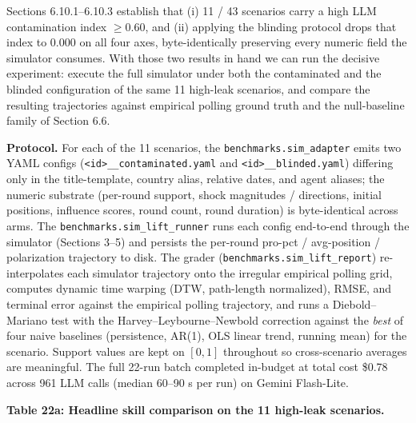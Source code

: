 \documentclass[
]{article}
\begin{document}
Sections 6.10.1--6.10.3 establish that (i) 11 / 43 scenarios carry a
high LLM contamination index \(\geq 0.60\), and (ii) applying the
blinding protocol drops that index to 0.000 on all four axes,
byte-identically preserving every numeric field the simulator consumes.
With those two results in hand we can run the decisive experiment:
execute the full simulator under both the contaminated and the blinded
configuration of the same 11 high-leak scenarios, and compare the
resulting trajectories against empirical polling ground truth and the
null-baseline family of Section 6.6.

\textbf{Protocol.} For each of the 11 scenarios, the
\texttt{benchmarks.sim\_adapter} emits two YAML configs
(\texttt{\textless{}id\textgreater{}\_\_contaminated.yaml} and
\texttt{\textless{}id\textgreater{}\_\_blinded.yaml}) differing only in
the title-template, country alias, relative dates, and agent aliases;
the numeric substrate (per-round support, shock magnitudes / directions,
initial positions, influence scores, round count, round duration) is
byte-identical across arms. The \texttt{benchmarks.sim\_lift\_runner}
runs each config end-to-end through the simulator (Sections 3--5) and
persists the per-round pro-pct / avg-position / polarization trajectory
to disk. The grader (\texttt{benchmarks.sim\_lift\_report})
re-interpolates each simulator trajectory onto the irregular empirical
polling grid, computes dynamic time warping (DTW, path-length
normalized), RMSE, and terminal error against the empirical polling
trajectory, and runs a Diebold--Mariano test with the
Harvey--Leybourne--Newbold correction against the \emph{best} of four
naive baselines (persistence, AR(1), OLS linear trend, running mean) for
the scenario. Support values are kept on \([0, 1]\) throughout so
cross-scenario averages are meaningful. The full 22-run batch completed
in-budget at total cost \$0.78 across 961 LLM calls (median 60--90 s per
run) on Gemini Flash-Lite.

\textbf{Table 22a: Headline skill comparison on the 11 high-leak
scenarios.}
\end{document}
